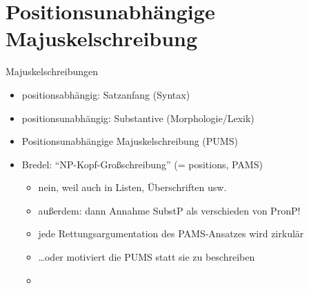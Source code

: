 \section[PUMS vs.\ PAMS]{Positionsunabhängige Majuskelschreibung}

\begin{frame}
  {Majuskelschreibungen}
  \pause
  \begin{itemize}[<+->]
    \item \alert{positionsabhängig}: Satzanfang (Syntax)
      \Halbzeile
    \item \alert{positionsunabhängig}: Substantive (Morphologie\slash Lexik)
    \item Positionsunabhängige Majuskelschreibung (PUMS)
      \Halbzeile
    \item Bredel: "`NP-Kopf-Großschreibung"' (= positions, PAMS)
      \begin{itemize}[<+->]
        \item nein, weil auch in Listen, Überschriften usw.
        \item außerdem: dann Annahme SubstP als verschieden von PronP!\\
        \item jede Rettungsargumentation des PAMS-Ansatzes wird zirkulär 
        \item \ldots oder \alert{motiviert} die PUMS statt sie zu beschreiben
        \item {}
      \end{itemize}
  \end{itemize}
\end{frame}


